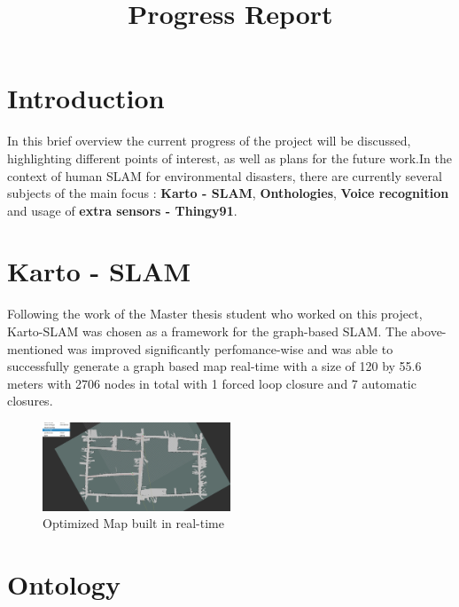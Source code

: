 \documentclass[conference]{IEEEtran}
\title{Progress Report}
\begin{document}
\author{
    \and

}

\maketitle
\section{Introduction}
In this brief overview the current progress of the project will be discussed, highlighting different
points of interest, as well as plans for the future work.In the context of human SLAM for environmental disasters, there are currently several subjects of the main focus : \textbf{Karto - SLAM}, \textbf{Onthologies}, \textbf{Voice recognition} and usage of \textbf{extra sensors - Thingy91}.



\section{Karto - SLAM}
Following the work of the Master thesis student who worked on this project, Karto-SLAM was
chosen as a framework for the graph-based SLAM. The above-mentioned was improved significantly
perfomance-wise and was able to successfully generate a graph based map real-time with a size of
120 by 55.6 meters with 2706 nodes in total with 1 forced loop closure and 7 automatic closures.
\begin{figure}[htbp]
    \centerline{\includegraphics[width=0.5\textwidth,height=\textheight,keepaspectratio]{Pictures/rviz_screenshot_2021_03_22-16_01_59.png}}
    \caption{Optimized Map built in real-time}

    \label{map}

\end{figure}

\section{Ontology}
\end{document}
